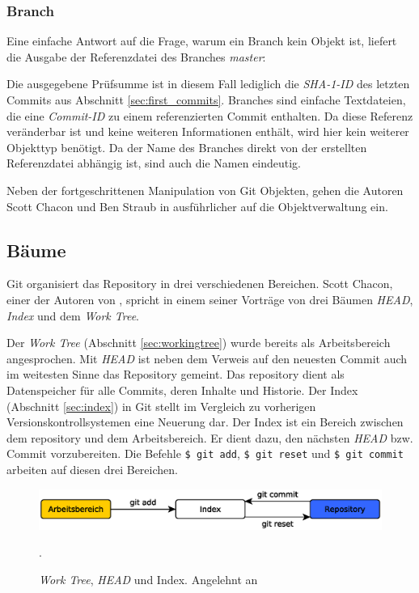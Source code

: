 \subsubsection{Branch}\label{sec:branchobject}
Eine einfache Antwort auf die Frage, warum ein Branch kein Objekt ist, liefert
die Ausgabe der Referenzdatei des Branches \textit{master}:


Die ausgegebene Prüfsumme ist in diesem Fall lediglich die \textit{SHA-1-ID}
des letzten Commits aus Abschnitt \ref{sec:first_commits}. Branches sind
einfache Textdateien, die eine \textit{Commit-ID} zu einem referenzierten
Commit enthalten. Da diese Referenz veränderbar ist und keine weiteren
Informationen enthält, wird hier kein weiterer Objekttyp benötigt. Da der Name
des Branches direkt von der erstellten Referenzdatei abhängig ist, sind auch
die Namen eindeutig.

Neben der fortgeschrittenen Manipulation von Git Objekten, gehen die Autoren
Scott Chacon und Ben Straub in \cite[S.~408-418]{progit} ausführlicher
auf die Objektverwaltung ein.

\subsection{Bäume}\label{sec:trees}
Git organisiert das Repository in drei verschiedenen Bereichen. Scott Chacon,
einer der Autoren von \cite{progit}, spricht in einem seiner
Vorträge \cite{link:talesoftrees} von drei Bäumen \textit{HEAD}, \textit{Index}
und dem \textit{Work Tree}.

Der \textit{Work Tree} (Abschnitt \ref{sec:workingtree}) wurde bereits als
Arbeitsbereich angesprochen. Mit \textit{\gls{HEAD}} ist neben dem Verweis auf
den neuesten Commit auch im weitesten Sinne das Repository gemeint. Das
\gls{repository} dient als Datenspeicher für alle Commits, deren Inhalte und
Historie. Der Index (Abschnitt \ref{sec:index}) in Git stellt im Vergleich zu
vorherigen Versionskontrollsystemen eine Neuerung dar. Der Index ist ein
Bereich zwischen dem \gls{repository} und dem Arbeitsbereich. Er dient dazu,
den nächsten \textit{\gls{HEAD}} bzw. Commit vorzubereiten. Die Befehle
\texttt{\$ git add}, \texttt{\$ git reset} und \texttt{\$ git commit} arbeiten
auf diesen drei Bereichen. \cite[34-35]{gitosp}

\begin{figure}[h]
    \centering
    \includegraphics[scale=0.60]{images/trees.eps}
    \caption{\textit{Work Tree}, \textit{HEAD} und Index. Angelehnt an
    \cite[34]{gitosp}}.
    \label{fig:trees}
\end{figure}

